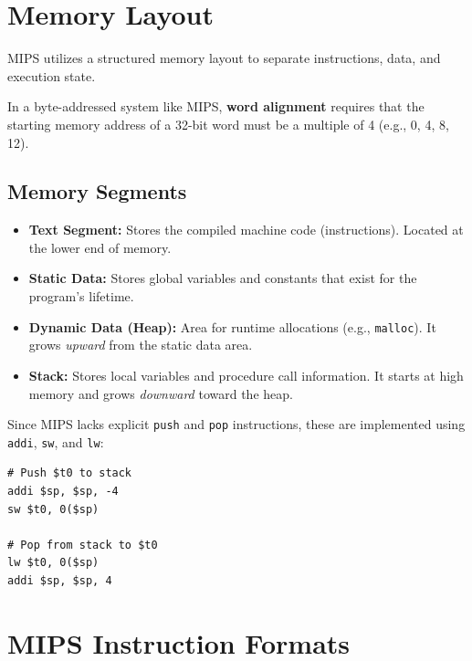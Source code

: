 \section{Memory Layout}

MIPS utilizes a structured memory layout to separate instructions, data, and execution state.

\begin{definition}
In a byte-addressed system like MIPS, \textbf{word alignment} requires that the starting memory address of a 32-bit word must be a multiple of 4 (e.g., 0, 4, 8, 12).
\end{definition}

\subsection{Memory Segments}

\begin{itemize}
    \item \textbf{Text Segment:} Stores the compiled machine code (instructions). Located at the lower end of memory.
    \item \textbf{Static Data:} Stores global variables and constants that exist for the program's lifetime.
    \item \textbf{Dynamic Data (Heap):} Area for runtime allocations (e.g., \texttt{malloc}). It grows \textit{upward} from the static data area.
    \item \textbf{Stack:} Stores local variables and procedure call information. It starts at high memory and grows \textit{downward} toward the heap.
\end{itemize}

\begin{example}
Since MIPS lacks explicit \texttt{push} and \texttt{pop} instructions, these are implemented using \texttt{addi}, \texttt{sw}, and \texttt{lw}:

\begin{verbatim}
# Push $t0 to stack
addi $sp, $sp, -4
sw $t0, 0($sp)

# Pop from stack to $t0
lw $t0, 0($sp)
addi $sp, $sp, 4
\end{verbatim}

\end{example}

\section{MIPS Instruction Formats}

